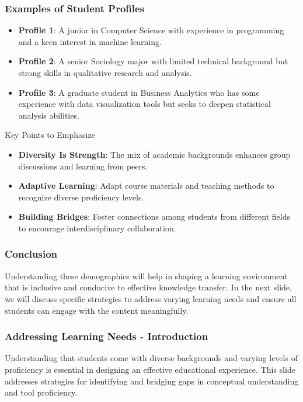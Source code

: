 \documentclass[aspectratio=169]{beamer}
\begin{document}
\begin{frame}[fragile]
    \frametitle{Examples of Student Profiles}

    \begin{itemize}
        \item \textbf{Profile 1}: A junior in Computer Science with experience in programming and a keen interest in machine learning.
        \item \textbf{Profile 2}: A senior Sociology major with limited technical background but strong skills in qualitative research and analysis.
        \item \textbf{Profile 3}: A graduate student in Business Analytics who has some experience with data visualization tools but seeks to deepen statistical analysis abilities.
    \end{itemize}
    
    \begin{block}{Key Points to Emphasize}
        \begin{itemize}
            \item \textbf{Diversity Is Strength}: The mix of academic backgrounds enhances group discussions and learning from peers.
            \item \textbf{Adaptive Learning}: Adapt course materials and teaching methods to recognize diverse proficiency levels.
            \item \textbf{Building Bridges}: Foster connections among students from different fields to encourage interdisciplinary collaboration.
        \end{itemize}
    \end{block}
\end{frame}

\begin{frame}[fragile]
    \frametitle{Conclusion}
    
    Understanding these demographics will help in shaping a learning environment that is inclusive and conducive to effective knowledge transfer. In the next slide, we will discuss specific strategies to address varying learning needs and ensure all students can engage with the content meaningfully.
\end{frame}

\begin{frame}[fragile]
    \frametitle{Addressing Learning Needs - Introduction}
    Understanding that students come with diverse backgrounds and varying levels of proficiency is essential in designing an effective educational experience. This slide addresses strategies for identifying and bridging gaps in conceptual understanding and tool proficiency.
\end{frame}
\end{document}
